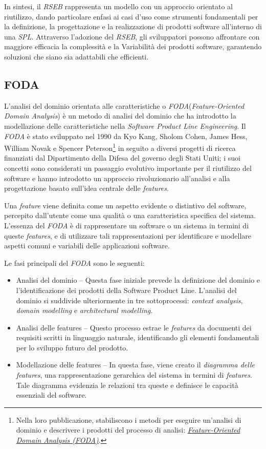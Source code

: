 \documentclass[12pt]{report}
\newcommand{\spl}{\textsl{SPL}\xspace}
\newcommand{\rseb}{\textsl{RSEB}\xspace}
\newcommand{\foda}{\textsl{FODA}\xspace}
\begin{document}
In sintesi, il \rseb rappresenta un modello con un approccio orientato al riutilizzo, dando particolare enfasi ai casi d'uso come strumenti fondamentali per la definizione, la progettazione e la realizzazione di prodotti software all'interno di una \spl. Attraverso l'adozione del \rseb, gli sviluppatori possono affrontare con maggiore efficacia la complessità e la Variabilità dei prodotti software, garantendo soluzioni che siano sia adattabili che efficienti.


\subsection{FODA}
L'analisi del dominio orientata alle caratteristiche o \foda (\textit{Feature-Oriented Domain Analysis}) è un metodo di analisi del dominio che ha introdotto la modellazione delle caratteristiche nella \textit{Software Product Line Engineering}. Il \foda è stato sviluppato nel 1990 da Kyo Kang, Sholom Cohen, James Hess, William Novak e Spencer Peterson\footnote{Nella loro pubblicazione, stabiliscono i metodi per eseguire un'analisi di dominio e descrivere i prodotti del processo di analisi: \href{https://insights.sei.cmu.edu/documents/1011/1990_005_001_15872.pdf}{\textit{Feature-Oriented Domain Analysis (FODA)}}.} in seguito a diversi progetti di ricerca finanziati dal Dipartimento della Difesa del governo degli Stati Uniti; i suoi concetti sono considerati un passaggio evolutivo importante per il riutilizzo del software e hanno introdotto un approccio rivoluzionario all'analisi e alla progettazione basato sull'idea centrale delle \textit{features}.

Una \textit{feature} viene definita come un aspetto evidente o distintivo del software, percepito dall'utente come una qualità o una caratteristica specifica del sistema. L'essenza del \foda è di rappresentare un software o un sistema in termini di queste \textit{features}, e di utilizzare tali rappresentazioni per identificare e modellare aspetti comuni e variabili delle applicazioni software.

Le fasi principali del \foda sono le seguenti:

\begin{itemize}
\item \textsf{Analisi del dominio} -- Questa fase iniziale prevede la definizione del dominio e l'identificazione dei prodotti della Software Product Line. L'analisi del dominio si suddivide ulteriormente in tre sottoprocessi: \textit{context analysis}, \textit{domain modelling} e \textit{architectural modelling}.

\item \textsf{Analisi delle features} -- Questo processo estrae le \textit{features} da documenti dei requisiti scritti in linguaggio naturale, identificando gli elementi fondamentali per lo sviluppo futuro del prodotto.

\item \textsf{Modellazione delle features} -- In questa fase, viene creato il \textit{diagramma delle features}, una rappresentazione gerarchica del sistema in termini di \textit{features}. Tale diagramma evidenzia le relazioni tra queste e definisce le capacità essenziali del software.
\end{itemize}
\end{document}
